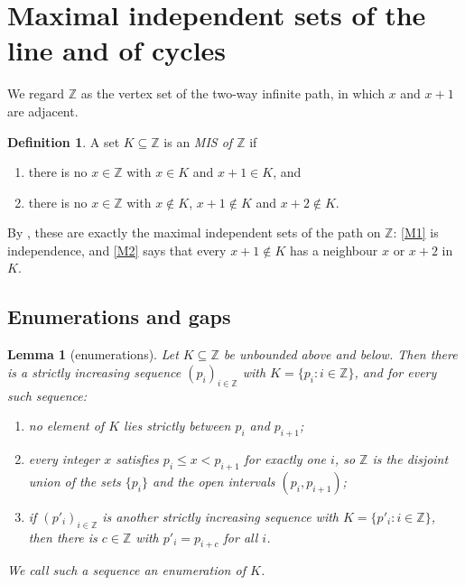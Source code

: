 \documentclass[11pt]{article}
\theoremstyle{plain}
\newtheorem{lemma}[lemma]{Lemma}
\theoremstyle{definition}
\newtheorem{definition}[definition]{Definition}
\theoremstyle{remark}
\newcommand{\Z}{\mathbb{Z}}
\begin{document}
\section{Maximal independent sets of the line and of cycles}\label{sec:line}

We regard $\Z$ as the vertex set of the two-way infinite path, in which $x$ and $x+1$ are
adjacent.

\begin{definition}\label{def:mis-line}
A set $K \subseteq \Z$ is an \emph{MIS of $\Z$} if
\begin{enumerate}[label=(M\arabic*)]
  \item\label{M1} there is no $x \in \Z$ with $x \in K$ and $x+1 \in K$, and
  \item\label{M2} there is no $x \in \Z$ with $x \notin K$, $x+1 \notin K$ and
        $x+2 \notin K$.
\end{enumerate}
\end{definition}

By , these are exactly the maximal independent sets of the path on $\Z$:
\ref{M1} is independence, and \ref{M2} says that every $x+1 \notin K$ has a neighbour $x$ or
$x+2$ in $K$.

\subsection{Enumerations and gaps}

\begin{lemma}[enumerations]\label{lem:enum}
Let $K \subseteq \Z$ be unbounded above and below. Then there is a strictly increasing sequence
$(p_i)_{i \in \Z}$ with $K = \{p_i : i \in \Z\}$, and for every such sequence:
\begin{enumerate}[label=(\alph*)]
  \item no element of $K$ lies strictly between $p_i$ and $p_{i+1}$;
  \item every integer $x$ satisfies $p_i \le x < p_{i+1}$ for exactly one $i$, so $\Z$ is the
        disjoint union of the sets $\{p_i\}$ and the open intervals $(p_i, p_{i+1})$;
  \item if $(p'_i)_{i \in \Z}$ is another strictly increasing sequence with
        $K = \{p'_i : i \in \Z\}$, then there is $c \in \Z$ with $p'_i = p_{i+c}$ for all $i$.
\end{enumerate}
We call such a sequence an \emph{enumeration} of $K$.
\end{lemma}
\end{document}

